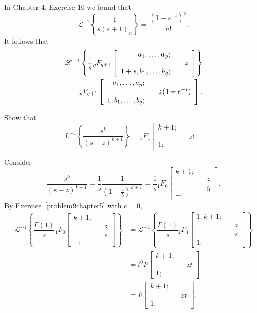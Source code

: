 \begin{solution}
In Chapter 4, Exercise 16 we found that
$$\mathscr{L}^{-1} \left\{ \dfrac{1}{s(s+1)_n} \right\} = \dfrac{(1-e^{-t})^n}{n!}.$$
It follows that
\begin{eqnarray*}
\lefteqn{\mathscr{L}^{-1} \left\{ \dfrac{1}{s} {}_pF_{q+1} \left[ \begin{array}{rlr}
a_1, \ldots, a_p; & & \\
& & z \\
1+s, b_1, \ldots, b_q; & &
\end{array} \right] \right\}} \\
& & = {}_p F_{q+1} \left[ \begin{array}{rlr}
a_1, \ldots, a_p; & & \\
& & z(1-e^{-t}) \\
1, b_1, \ldots, b_q; & &
\end{array} \right].
\end{eqnarray*}
\end{solution}
\begin{problem}\label{problem11chapter5}
Show that
$$L^{-1} \left\{ \dfrac{s^k}{(s-z)^{k+1}} \right\} = {}_1F_1 \left[ \begin{array}{rlr}
k+1; & & \\
& & zt \\
1; & &
\end{array} \right] $$
\end{problem}
\begin{solution}
Consider 
$$\dfrac{s^k}{(s-z)^{k+1}} = \dfrac{1}{s} \dfrac{1}{(1 - \frac{4}{5})^{k+1}} = \dfrac{1}{s} {}_1F_0 \left[ \begin{array}{rlr}
k+1; & & \\
& & \dfrac{z}{5} \\
-; & &
\end{array} \right].$$
By Exercise~\ref{problem9chapter5} with $c=0$,
$$\begin{array}{ll}
\mathscr{L}^{-1} \left\{ \dfrac{\Gamma(1)}{s} {}_1 F_0 \left[ \begin{array}{rlr}
k+1; & & \\
& & \dfrac{z}{s} \\
-; & &
\end{array} \right] \right\} &= \mathscr{L}^{-1} \left\{ \dfrac{\Gamma(1)}{s} {}_2F_1 \left[ \begin{array}{rlr}
1, k+1; & & \\
& & \dfrac{z}{s} \\
1; & &
\end{array} \right] \right\} \\
&= t^0 F \left[ \begin{array}{rlr}
k+1; & & \\
& & zt \\
1; & &
\end{array} \right] \\
&= F \left[ \begin{array}{rlr}
k+1; & & \\
& & zt \\
1; & & 
\end{array} \right].
\end{array}$$
\end{solution}

